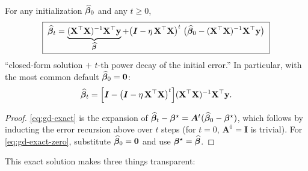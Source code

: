 \begin{theorem}\label{thm:gd-exact}
For any initialization $\widehat{\bm{\beta}}_0$ and any $t \ge 0$,
\begin{equation}\label{eq:gd-exact}
  \boxed{\;\widehat{\bm{\beta}}_t = \underbrace{(\mathbf{X}^\top \mathbf{X})^{-1} \mathbf{X}^\top \mathbf{y}}_{\widehat{\bm{\beta}}}
  + \big( \bm{I} - \eta\, \mathbf{X}^\top \mathbf{X} \big)^{t}\; \big( \widehat{\bm{\beta}}_0 - (\mathbf{X}^\top \mathbf{X})^{-1} \mathbf{X}^\top \mathbf{y} \big)\;}
\end{equation}
``closed-form solution $+$ $t$-th power decay of the initial error.'' In particular, with the most common default $\widehat{\bm{\beta}}_0 = \mathbf{0}$:
\begin{equation}\label{eq:gd-exact-zero}
  \widehat{\bm{\beta}}_t = \Big[ \bm{I} - \big( \bm{I} - \eta\, \mathbf{X}^\top \mathbf{X} \big)^{t} \Big] (\mathbf{X}^\top \mathbf{X})^{-1} \mathbf{X}^\top \mathbf{y} .
\end{equation}
\end{theorem}
\begin{proof}
\eqref{eq:gd-exact} is the expansion of $\widehat{\bm{\beta}}_t - \bm{\beta}^\star = \bm{A}^t (\widehat{\bm{\beta}}_0 - \bm{\beta}^\star)$, which follows by inducting the error recursion above over $t$ steps (for $t=0$, $\bm{A}^0 = \bm{I}$ is trivial). For \eqref{eq:gd-exact-zero}, substitute $\widehat{\bm{\beta}}_0 = \mathbf{0}$ and use $\bm{\beta}^\star = \widehat{\bm{\beta}}$.
\end{proof}

This exact solution makes three things transparent:

